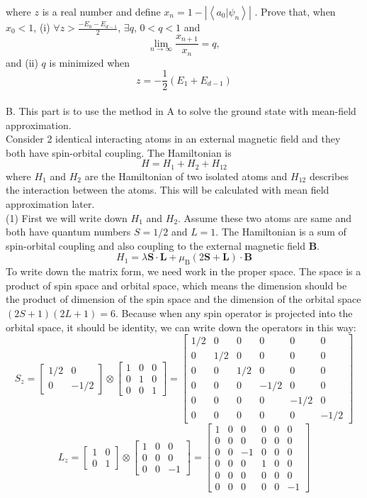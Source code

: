 \documentclass[letter]{article}
\begin{document}
where $z$ is a real number and define $x_n=1-\left|\left<a_0|\psi_n\right>\right|$
. Prove that, when $x_0<1$, (i) $\forall z >\frac{-E_0-E_{d-1}}{2}$, $\exists q$, $0< q <1$ and $$
\lim _{n\rightarrow \infty} \frac{x_{n+1}}{x_n}=q,
$$
and (ii) $q$ is minimized when $$z=-\frac{1}{2}\left(E_1+E_{d-1}\right)$$\\
{\large{B}}. This part is to use the method in A to solve the ground state with mean-field approximation. \\
\indent Consider 2 identical interacting atoms in an external magnetic field and they both have spin-orbital coupling. The Hamiltonian is 
$$
H=H_1+H_2+H_{12}
$$
where $H_1$ and $H_2$ are the Hamiltonian of two isolated atoms and $H_{12}$ describes the interaction between the atoms. This will be calculated with mean field approximation later. \\
\indent (1) First we will write down $H_{1}$ and $H_2$. Assume these two atoms are same and both have quantum numbers $S=1/2$ and $L=1$. The Hamiltonian is a sum of spin-orbital coupling and also coupling to the external magnetic field $\bm{B}$.
$$H_1=\lambda \bm{S}\cdot\bm{L}+\mu_{\mathrm{B}}(2\bm{S}+\bm{L})\cdot\bm{B}
$$
To write down the matrix form, we need work in the proper space. The space is a product of spin space and orbital space, which means the dimension should be the product of dimension of the spin space and the dimension of the orbital space $(2S+1)(2L+1)=6$. Because when any spin operator is projected into the orbital space, it should be identity, we can write down the operators in this way:
$$S_z=\begin{bmatrix}
1/2 & 0\\
0 & -1/2
\end{bmatrix} \otimes \begin{bmatrix}
1 &0 &0\\
0 & 1 & 0 \\
0 &0 &1
\end{bmatrix}=\begin{bmatrix}
1/2 &0 &0 &0 &0 &0\\
0 &1/2 &0 &0 &0 &0\\
0 &0 &1/2 &0 &0 &0\\
0 &0 &0 &-1/2 &0 &0\\
0 &0 &0 &0 &-1/2 &0\\
0 &0 &0 &0 &0 &-1/2
\end{bmatrix}
$$
$$L_z=\begin{bmatrix}
1 & 0\\
0 & 1
\end{bmatrix} \otimes \begin{bmatrix}
1 &0 &0\\
0 & 0 & 0 \\
0 &0 &-1
\end{bmatrix}=\begin{bmatrix}
1 &0 &0 &0 &0 &0\\
0 &0 &0 &0 &0 &0\\
0 &0 &-1 &0 &0 &0\\
0 &0 &0 &1 &0 &0\\
0 &0 &0 &0 &0 &0\\
0 &0 &0 &0 &0 &-1
\end{bmatrix}
$$
\end{document}
